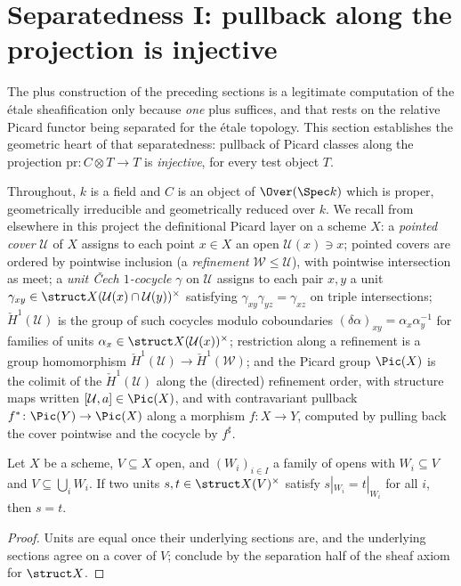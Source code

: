 \section{Separatedness I: pullback along the projection is injective}

The plus construction of the preceding sections is a legitimate computation of the \'etale
sheafification only because \emph{one} plus suffices, and that rests on the relative Picard
functor being separated for the \'etale topology. This section establishes the geometric heart
of that separatedness: pullback of Picard classes along the projection
\(\mathrm{pr} \colon C \otimes T \to T\) is \emph{injective}, for every test object \(T\).

Throughout, \(k\) is a field and \(C\) is an object of \(\Over(\Spec k)\) which is proper,
geometrically irreducible and geometrically reduced over \(k\). We recall from elsewhere in
this project the definitional Picard layer on a scheme \(X\): a \emph{pointed cover}
\(\mathcal U\) of \(X\) assigns to each point \(x \in X\) an open \(\mathcal U(x) \ni x\);
pointed covers are ordered by pointwise inclusion (a \emph{refinement}
\(\mathcal W \le \mathcal U\)), with pointwise intersection as meet; a \emph{unit \v Cech
\(1\)-cocycle} \(\gamma\) on \(\mathcal U\) assigns to each pair \(x,y\) a unit
\(\gamma_{xy} \in \struct X(\mathcal U(x) \cap \mathcal U(y))^{\times}\) satisfying
\(\gamma_{xy}\gamma_{yz} = \gamma_{xz}\) on triple intersections; \(\check H^1(\mathcal U)\)
is the group of such cocycles modulo coboundaries \((\delta\alpha)_{xy} =
\alpha_x\alpha_y^{-1}\) for families of units \(\alpha_x \in
\struct X(\mathcal U(x))^{\times}\); restriction along a refinement is a group homomorphism
\(\check H^1(\mathcal U) \to \check H^1(\mathcal W)\); and the Picard group
\(\Pic(X)\) is the colimit of the \(\check H^1(\mathcal U)\) along the (directed) refinement
order, with structure maps written \([\mathcal U, a] \in \Pic(X)\), and with contravariant
pullback \(f^{*} \colon \Pic(Y) \to \Pic(X)\) along a morphism \(f \colon X \to Y\), computed
by pulling back the cover pointwise and the cocycle by \(f^{\sharp}\).

\begin{lemma}
  \label{lem:units_separation}
  \leanok
  Let \(X\) be a scheme, \(V \subseteq X\) open, and \((W_i)_{i \in I}\) a family of opens
  with \(W_i \subseteq V\) and \(V \subseteq \bigcup_i W_i\). If two units
  \(s, t \in \struct X(V)^{\times}\) satisfy \(s|_{W_i} = t|_{W_i}\) for all \(i\), then
  \(s = t\).
\end{lemma}
\begin{proof}
  \leanok
  Units are equal once their underlying sections are, and the underlying sections agree on a
  cover of \(V\); conclude by the separation half of the sheaf axiom for \(\struct X\).
\end{proof}

